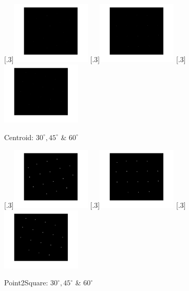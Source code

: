 \documentclass[a4paper]{article}
\begin{document}
	\begin{figure}[H]
		\centering
		[.3\linewidth]{\includegraphics[height=3cm]{Results/Q3/a/qaCentroid30.jpg}}%
		[.3\linewidth]{\includegraphics[height=3cm]{Results/Q3/a/qaCentroid45.jpg}}%
		[.3\linewidth]{\includegraphics[height=3cm]{Results/Q3/a/qaCentroid60.jpg}}%
		\caption{Centroid: $30^\circ, 45^\circ$ \& $60^\circ$}
		\label{fig:}
	\end{figure}
	\begin{figure}[H]
		\centering
		[.3\linewidth]{\includegraphics[height=3cm]{Results/Q3/a/qaP2S30.jpg}}%
		[.3\linewidth]{\includegraphics[height=3cm]{Results/Q3/a/qaP2S45.jpg}}%
		[.3\linewidth]{\includegraphics[height=3cm]{Results/Q3/a/qaP2S60.jpg}}%
		\caption{Point2Square: $30^\circ, 45^\circ$ \& $60^\circ$}
		\label{fig:}
	\end{figure}
\end{document}
